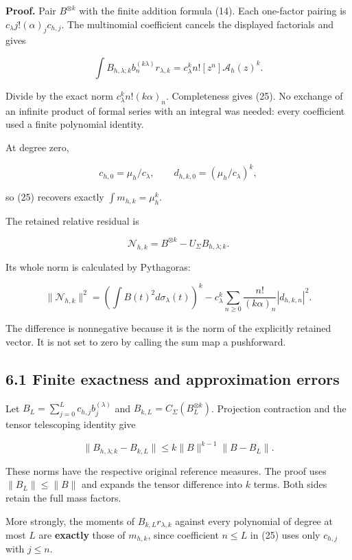 \documentclass[
  11pt,
]{article}
\begin{document}
\textbf{Proof.} Pair \(B^{\otimes k}\) with the finite addition formula
(14). Each one-factor pairing is \(c_\lambda j!(\alpha)_j c_{h,j}\). The
multinomial coefficient cancels the displayed factorials and gives

\[
\int B_{h,\lambda;k} b_n^{(k\lambda)}r_{\lambda,k}
=c_\lambda^k n! [z^n]\mathcal A_h(z)^k.
\]

Divide by the exact norm \(c_\lambda^k n!(k\alpha)_n\). Completeness
gives (25). No exchange of an infinite product of formal series with an
integral was needed: every coefficient used a finite polynomial
identity.

At degree zero,

\[
c_{h,0}=\mu_h/c_\lambda,\qquad
 d_{h,k,0}=(\mu_h/c_\lambda)^k,
\]

so (25) recovers exactly \(\int m_{h,k}=\mu_h^k\).

The retained relative residual is

\[
\mathcal N_{h,k}=B^{\otimes k}-U_\Sigma B_{h,\lambda;k}.
\]

Its whole norm is calculated by Pythagoras:

\[
\boxed{
\|\mathcal N_{h,k}\|^2
=\left(\int B(t)^2d\sigma_\lambda(t)\right)^k
-c_\lambda^k\sum_{n\ge0}\frac{n!}{(k\alpha)_n}|d_{h,k,n}|^2.
}                                                                   \tag{26}
\]

The difference is nonnegative because it is the norm of the explicitly
retained vector. It is not set to zero by calling the sum map a
pushforward.

\subsection{6.1 Finite exactness and approximation
errors}\label{finite-exactness-and-approximation-errors}

Let \(B_L=\sum_{j=0}^L c_{h,j}b_j^{(\lambda)}\) and
\(B_{k,L}=C_\Sigma(B_L^{\otimes k})\). Projection contraction and the
tensor telescoping identity give

\[
\boxed{
\|B_{h,\lambda;k}-B_{k,L}\|
\le k\|B\|^{k-1}\|B-B_L\|.
}                                                                   \tag{27}
\]

These norms have the respective original reference measures. The proof
uses \(\|B_L\|\le\|B\|\) and expands the tensor difference into \(k\)
terms. Both sides retain the full mass factors.

More strongly, the moments of \(B_{k,L}r_{\lambda,k}\) against every
polynomial of degree at most \(L\) are \textbf{exactly} those of
\(m_{h,k}\), since coefficient \(n\le L\) in (25) uses only \(c_{h,j}\)
with \(j\le n\).
\end{document}
